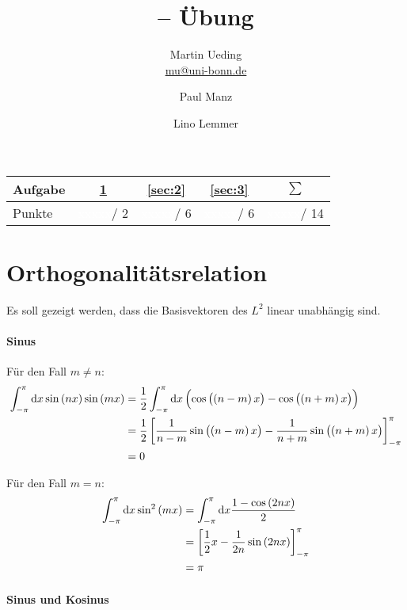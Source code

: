 \documentclass[11pt, ngerman, fleqn]{article}
\title{\themodul{} -- Übung \theuebung \\ \vspace{0.5cm} \large{\thegruppe}}
\author{Martin Ueding \\ \small{\href{mailto:mu@uni-bonn.de}{mu@uni-bonn.de}} \and Paul Manz \and Lino Lemmer}
\newcommand{\half}{\frac 12}
\newcommand{\punkte}{\textcolor{white}{xxxxx}}
\begin{document}
\maketitle

\begin{table}[h]
	\centering
	\begin{tabular}{l|c|c|c|c}
		Aufgabe & \ref{sec:1} & \ref{sec:2} & \ref{sec:3} & $\sum$   \\
		\hline
		Punkte & \punkte / 2 & \punkte / 6 & \punkte / 6 & \punkte / 14
	\end{tabular}
\end{table}


\section{Orthogonalitätsrelation}
\label{sec:1}

Es soll gezeigt werden, dass die Basisvektoren des $L^2$ linear unabhängig sind.

\paragraph{Sinus}

Für den Fall $m \neq n$:
\begin{align*}
	\int_{-\pi}^\pi \dif x \sin\del{nx} \sin\del{mx}
	&= \half \int_{-\pi}^\pi \dif x \del{\cos\del{\del{n-m} x} - \cos\del{\del{n+m} x}} \\
	&= \half \sbr{\frac{1}{n-m} \sin\del{\del{n-m} x} - \frac{1}{n+m} \sin\del{\del{n+m} x}}_{-\pi}^\pi  \\
	&= 0
\end{align*}

Für den Fall $m = n$:
\begin{align*}
	\int_{-\pi}^\pi \dif x \sin^2\del{mx}
	&= \int_{-\pi}^\pi \dif x \frac{1-\cos\del{2nx}}{2} \\
	&= \sbr{\half x - \frac{1}{2n} \sin\del{2nx}}_{-\pi}^\pi \\
	&= \pi
\end{align*}

\paragraph{Sinus und Kosinus}
\end{document}
